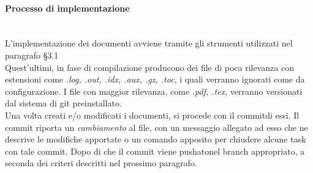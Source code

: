 
\paragraph{Processo di implementazione} \-\\
L'implementazione dei documenti avviene tramite gli strumenti utilizzati nel paragrafo §3.1\\
Quest'ultimi, in fase di compilazione producono dei file di poca rilevanza con estensioni come \textit{.log, .out, .idx, .aux, .gz, .toc}, i quali verranno ignorati come da configurazione. I file con maggior rilevanza, come \textit{.pdf, .tex}, verranno versionati dal sistema di git preinstallato. \\
Una volta creati e/o modificati i documenti, si procede con il commit\glossario di essi. Il commit riporta un \textit{cambiamento} al file, con un messaggio allegato ad esso che ne 
descrive le modifiche apportate o un comando apposito per chiudere alcune task con tale commit. Dopo di che il commit viene pushato\glossario nel branch appropriato, a seconda dei criteri descritti nel prossimo paragrafo. 

